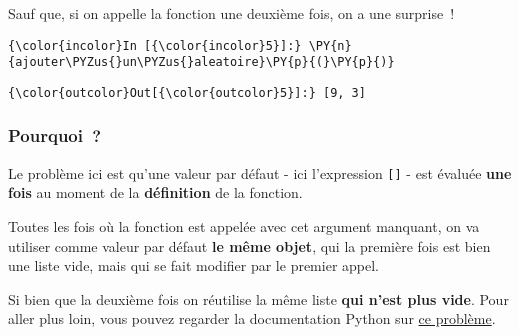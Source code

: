     Sauf que, si on appelle la fonction une deuxième fois, on a une
surprise~!

    \begin{Verbatim}[commandchars=\\\{\},frame=single,framerule=0.3mm,rulecolor=\color{cellframecolor}]
{\color{incolor}In [{\color{incolor}5}]:} \PY{n}{ajouter\PYZus{}un\PYZus{}aleatoire}\PY{p}{(}\PY{p}{)}
\end{Verbatim}


\begin{Verbatim}[commandchars=\\\{\},frame=single,framerule=0.3mm,rulecolor=\color{cellframecolor}]
{\color{outcolor}Out[{\color{outcolor}5}]:} [9, 3]
\end{Verbatim}
            
    \hypertarget{pourquoi}{%
\subsubsection{Pourquoi~?}\label{pourquoi}}

    Le problème ici est qu'une valeur par défaut - ici l'expression
\texttt{{[}{]}} - est évaluée \textbf{une fois} au moment de la
\textbf{définition} de la fonction.

Toutes les fois où la fonction est appelée avec cet argument manquant,
on va utiliser comme valeur par défaut \textbf{le même objet}, qui la
première fois est bien une liste vide, mais qui se fait modifier par le
premier appel.

Si bien que la deuxième fois on réutilise la même liste \textbf{qui
n'est plus vide}. Pour aller plus loin, vous pouvez regarder la
documentation Python sur
\href{https://docs.python.org/3/faq/programming.html\#why-are-default-values-shared-between-objects}{ce
problème}.


    
    
    
